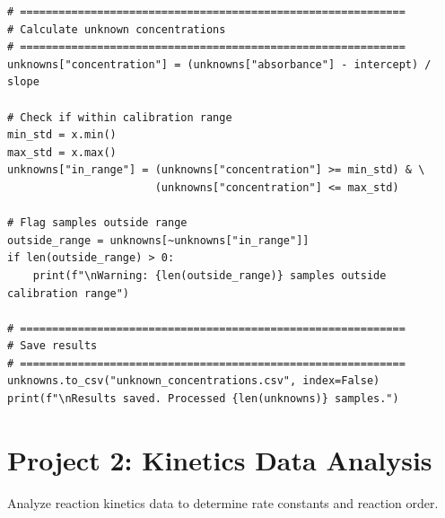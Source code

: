 \begin{lstlisting}
# ============================================================
# Calculate unknown concentrations
# ============================================================
unknowns["concentration"] = (unknowns["absorbance"] - intercept) / slope

# Check if within calibration range
min_std = x.min()
max_std = x.max()
unknowns["in_range"] = (unknowns["concentration"] >= min_std) & \
                       (unknowns["concentration"] <= max_std)

# Flag samples outside range
outside_range = unknowns[~unknowns["in_range"]]
if len(outside_range) > 0:
    print(f"\nWarning: {len(outside_range)} samples outside calibration range")

# ============================================================
# Save results
# ============================================================
unknowns.to_csv("unknown_concentrations.csv", index=False)
print(f"\nResults saved. Processed {len(unknowns)} samples.")
\end{lstlisting}

\section{Project 2: Kinetics Data Analysis}
\label{sec:project-kinetics}

Analyze reaction kinetics data to determine rate constants and reaction order.

